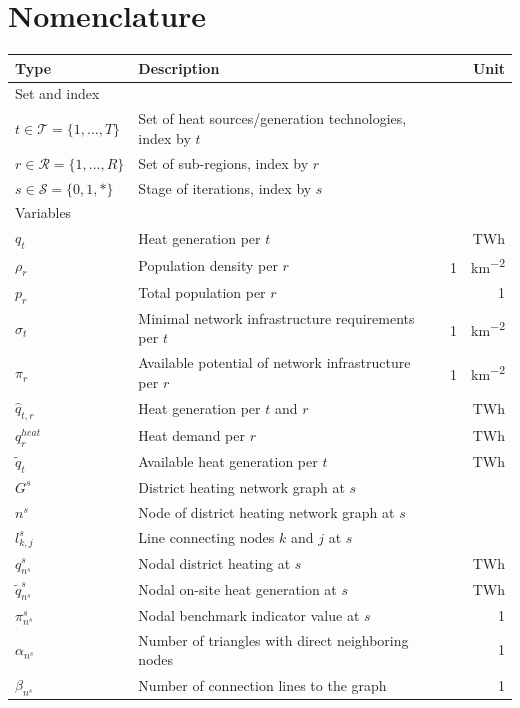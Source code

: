 \documentclass[review]{elsarticle}
\begin{document}
\section*{Nomenclature}
\begin{center}
	\renewcommand{\arraystretch}{1.1}
	\centering
	\small
	\begin{tabular}{lm{8cm}r}
		Type & Description & Unit\\
		\hline
		Set and index & & \\
		\hline
		{$t \in \mathcal{T}=\{1,\ldots,T\}$} & Set of heat sources/generation technologies, index by $t$\\
		{$r \in \mathcal{R}=\{1,\ldots,R\}$} & Set of sub-regions, index by $r$\\
		{$s \in \mathcal{S}=\{0,1,*\}$} & Stage of iterations, index by $s$\\
		\hline
		Variables\\
		\hline
		{$q_{t}$} & Heat generation per $t$ & \SI{}{TWh}\\
		{$\rho_{r}$} & Population density per $r$ & \SI{}{1 \per \per km^2}\\
		{$p_{r}$} & Total population per $r$ & \SI{}{1}\\
		{$\sigma_{t}$} & Minimal network infrastructure requirements per $t$& \SI{}{1 \per \per km^2}\\
		{$\pi_{r}$} & Available potential of network infrastructure per $r$& \SI{}{1 \per \per km^2}\\
		{$\hat{q}_{t,r}$} & Heat generation per $t$ and $r$& \SI{}{TWh}\\
		{$q^{heat}_{r}$} & Heat demand per $r$& \SI{}{TWh}\\
		{$\tilde{q}_{t}$} & Available heat generation per $t$& \SI{}{TWh}\\
		{$G^{s}$} & District heating network graph at $s$ & \\
		{$n^{s}$} & Node of district heating network graph at $s$ & \\
		{$l^{s}_{k,j}$} & Line connecting nodes $k$ and $j$ at $s$ & \\
		{$q^{s}_{n^{s}}$} & Nodal district heating at $s$ & \SI{}{TWh}\\
		{$\tilde{q}^{s}_{n^{s}}$} & Nodal on-site heat generation at $s$ & \SI{}{TWh}\\
		{$\pi^{s}_{n^{s}}$} & Nodal benchmark indicator value at $s$ & \SI{}{1}\\
		{$\alpha_{n^{s}}$} & Number of triangles with direct neighboring nodes & \SI{}{1}\\
		{$\beta_{n^{s}}$} & Number of connection lines to the graph & \SI{}{1}\\		
		\hline
	\end{tabular}
\end{center}
\newpage
\end{document}
